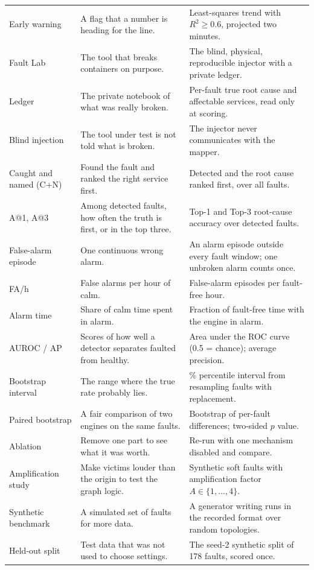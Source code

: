 \begin{longtable}{>{\raggedright\arraybackslash}p{3.1cm}>{\raggedright\arraybackslash}p{5.5cm}>{\raggedright\arraybackslash}p{5.6cm}}
Early warning & A flag that a number is heading for the line. & Least-squares trend with $R^2\ge0.6$, projected two minutes.\\
Fault Lab & The tool that breaks containers on purpose. & The blind, physical, reproducible injector with a private ledger.\\
Ledger & The private notebook of what was really broken. & Per-fault true root cause and affectable services, read only at scoring.\\
Blind injection & The tool under test is not told what is broken. & The injector never communicates with the mapper.\\
Caught and named (C+N) & Found the fault and ranked the right service first. & Detected and the root cause ranked first, over all faults.\\
A@1, A@3 & Among detected faults, how often the truth is first, or in the top three. & Top-1 and Top-3 root-cause accuracy over detected faults.\\
False-alarm episode & One continuous wrong alarm. & An alarm episode outside every fault window; one unbroken alarm counts once.\\
FA/h & False alarms per hour of calm. & False-alarm episodes per fault-free hour.\\
Alarm time & Share of calm time spent in alarm. & Fraction of fault-free time with the engine in alarm.\\
AUROC / AP & Scores of how well a detector separates faulted from healthy. & Area under the ROC curve (0.5 = chance); average precision.\\
Bootstrap interval & The range where the true rate probably lies. & 95\% percentile interval from resampling faults with replacement.\\
Paired bootstrap & A fair comparison of two engines on the same faults. & Bootstrap of per-fault differences; two-sided $p$ value.\\
Ablation & Remove one part to see what it was worth. & Re-run with one mechanism disabled and compare.\\
Amplification study & Make victims louder than the origin to test the graph logic. & Synthetic soft faults with amplification factor $A\in\{1,\dots,4\}$.\\
Synthetic benchmark & A simulated set of faults for more data. & A generator writing runs in the recorded format over random topologies.\\
Held-out split & Test data that was not used to choose settings. & The seed-2 synthetic split of 178 faults, scored once.\\

\end{longtable}
